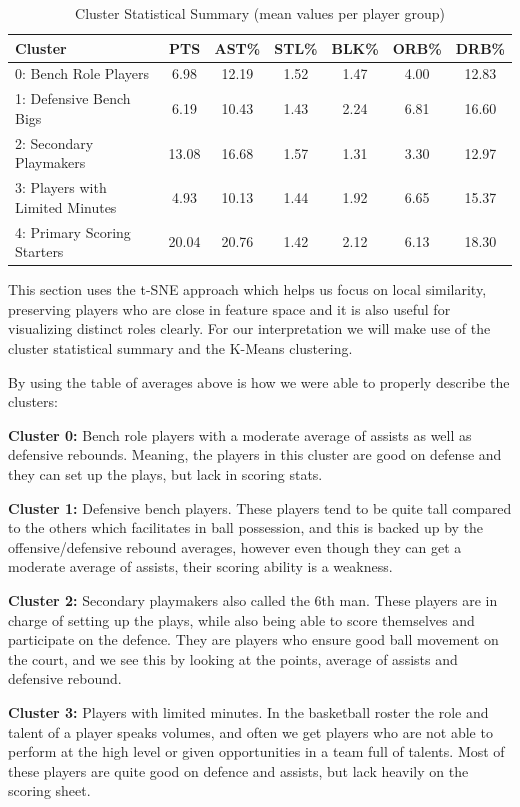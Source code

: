 \documentclass{article}
\begin{document}
\begin{table}[h!]
\centering
\caption{Cluster Statistical Summary (mean values per player group)}
\label{tab:cluster_stats}
\begin{tabular}{lcccccc}
\toprule
\textbf{Cluster} & \textbf{PTS} & \textbf{AST\%} & \textbf{STL\%} & \textbf{BLK\%} & \textbf{ORB\%} & \textbf{DRB\%} \\
\midrule
0: Bench Role Players & 6.98 & 12.19 & 1.52 & 1.47 & 4.00 & 12.83 \\
1: Defensive Bench Bigs & 6.19 & 10.43 & 1.43 & 2.24 & 6.81 & 16.60 \\
2: Secondary Playmakers & 13.08 & 16.68 & 1.57 & 1.31 & 3.30 & 12.97 \\
3: Players with Limited Minutes & 4.93 & 10.13 & 1.44 & 1.92 & 6.65 & 15.37 \\
4: Primary Scoring Starters & 20.04 & 20.76 & 1.42 & 2.12 & 6.13 & 18.30 \\
\bottomrule
\end{tabular}
\end{table}

This section uses the t-SNE approach which helps us focus on local similarity, preserving players who are close in feature space and it is also useful for visualizing distinct roles clearly. For our interpretation we will make use of the cluster statistical summary and the K-Means clustering.

By using the table of averages above is how we were able to properly describe the clusters:

{\bf Cluster 0:} Bench role players with a moderate average of assists as well as defensive rebounds. Meaning, the players in this cluster are good on defense and they can set up the plays, but lack in scoring stats.

{\bf Cluster 1:} Defensive bench players. These players tend to be quite tall compared to the others which facilitates in ball possession, and this is backed up by the offensive/defensive rebound averages, however even though they can get a moderate average of assists, their scoring ability is a weakness.

{\bf Cluster 2:} Secondary playmakers also called the 6th man. These players are in charge of setting up the plays, while also being able to score themselves and participate on the defence. They are players who ensure good ball movement on the court, and we see this by looking at the points, average of assists and defensive rebound. 

{\bf Cluster 3:} Players with limited minutes. In the basketball roster the role and talent of a player speaks volumes, and often we get players who are not able to perform at the high level or given opportunities in a team full of talents. Most of these players are quite good on defence and assists, but lack heavily on the scoring sheet.
\end{document}

